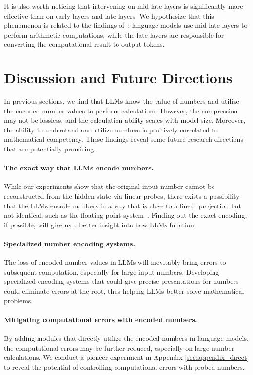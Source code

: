 \documentclass[11pt]{article}
\begin{document}
It is also worth noticing that intervening on mid-late layers is significantly more effective than on early layers and late layers.
We hypothesize that this phenomenon is related to the findings of~\citet{stolfo2023mechanistic}: language models use mid-late layers to perform arithmetic computations, while the late layers are responsible for converting the computational result to output tokens.


\section{Discussion and Future Directions}
In previous sections, we find that LLMs know the value of numbers and utilize the encoded number values to perform calculations.
However, the compression may not be lossless, and the calculation ability scales with model size.
Moreover, the ability to understand and utilize numbers is positively correlated to mathematical competency.
These findings reveal some future research directions that are potentially promising.

\paragraph{The exact way that LLMs encode numbers.}
While our experiments show that the original input number cannot be reconstructed from the hidden state via linear probes, there exists a possibility that the LLMs encode numbers in a way that is close to a linear projection but not identical, such as the floating-point system~\cite{muller2018handbook}.
Finding out the exact encoding, if possible, will give us a better insight into how LLMs function.

\paragraph{Specialized number encoding systems.}
The loss of encoded number values in LLMs will inevitably bring errors to subsequent computation, especially for large input numbers.
Developing specialized encoding systems that could give precise presentations for numbers~\cite{golkar2023xval} could eliminate errors at the root, thus helping LLMs better solve mathematical problems.

\paragraph{Mitigating computational errors with encoded numbers.}
By adding modules that directly utilize the encoded numbers in language models, the computational errors may be further reduced, especially on large-number calculations.
We conduct a pioneer experiment in Appendix \ref{sec:appendix_direct} to reveal the potential of controlling computational errors with probed numbers.
\end{document}
